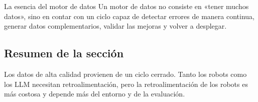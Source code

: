 \begin{importantbox}{La esencia del motor de datos}
Un motor de datos no consiste en «tener muchos datos», sino en contar con un ciclo capaz de detectar errores de manera continua, generar datos complementarios, validar las mejoras y volver a desplegar.
\end{importantbox}

\subsection{Resumen de la sección}

Los datos de alta calidad provienen de un ciclo cerrado. Tanto los robots como los LLM necesitan retroalimentación, pero la retroalimentación de los robots es más costosa y depende más del entorno y de la evaluación.
